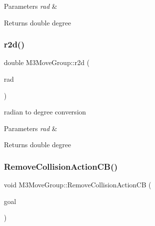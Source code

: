\begin{DoxyParams}{Parameters}
{\em rad} & \\
\hline
\end{DoxyParams}
\begin{DoxyReturn}{Returns}
double degree 
\end{DoxyReturn}
\mbox{\label{classM3MoveGroup_a08ae3af12542a9dd44d5f823c8b3bb46}} 
\subsubsection{\texorpdfstring{r2d()}{r2d()}\hspace{0.1cm}{\footnotesize\ttfamily [2/2]}}
{\footnotesize\ttfamily double M3\+Move\+Group\+::r2d (\begin{DoxyParamCaption}\item[{double}]{rad }\end{DoxyParamCaption})\hspace{0.3cm}{\ttfamily [inline]}}



radian to degree conversion 


\begin{DoxyParams}{Parameters}
{\em rad} & \\
\hline
\end{DoxyParams}
\begin{DoxyReturn}{Returns}
double degree 
\end{DoxyReturn}
\mbox{\label{classM3MoveGroup_afad468e11f51e093ef704ebe974ecc28}} 
\subsubsection{\texorpdfstring{Remove\+Collision\+Action\+C\+B()}{RemoveCollisionActionCB()}\hspace{0.1cm}{\footnotesize\ttfamily [1/2]}}
{\footnotesize\ttfamily void M3\+Move\+Group\+::\+Remove\+Collision\+Action\+CB (\begin{DoxyParamCaption}\item[{const m3\+\_\+moveit\+::\+Moveit\+Collide\+Goal\+Const\+Ptr \&}]{goal }\end{DoxyParamCaption})\hspace{0.3cm}{\ttfamily [inline]}}



